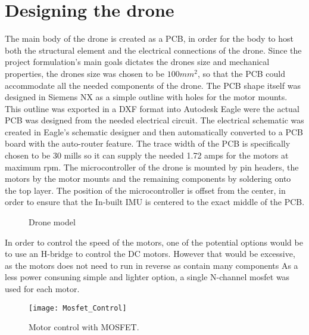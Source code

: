 \documentclass[12pt]{article}
\begin{document}
\section{Designing the drone}

The main body of the drone is created as a PCB, in order for the body to host both the structural element and the electrical connections of the drone. Since the project formulation’s main goals dictates the drones size and mechanical properties, the drones size was chosen to be $100 mm^2$, so that the PCB could accommodate all the needed components of the drone. The PCB shape itself was designed in Siemens NX as a simple outline with holes for the motor mounts. This outline was exported in a DXF format into Autodesk Eagle were the actual PCB was designed from the needed electrical circuit. The electrical schematic was created in Eagle’s schematic designer and then automatically converted to a PCB board with the auto-router feature. The trace width of the PCB is specifically chosen to be 30 mills so it can supply the needed 1.72 amps \cite{PCBTracewidth} for the motors at maximum rpm. The microcontroller of the drone is mounted by pin headers, the motors by the motor mounts and the remaining components by soldering onto the top layer. The position of the microcontroller is offset from the center, in order to ensure that the In-built IMU is centered to the exact middle of the PCB.

\begin{figure}[H]%
    \centering
    \qquad
    \caption{Drone model}%
    \label{fig:example}%
\end{figure}

In order to control the speed of the motors, one of the potential options would be to use an H-bridge to control
the DC motors. However that would be excessive, as the motors does not need to run in reverse as contain many components
As a less power consuning simple and lighter option, a single N-channel mosfet was used for each motor.

\begin{figure}[H]
    \begin{center}
    \texttt{[image: Mosfet\_Control]}
    \end{center}
    \caption{Motor control with MOSFET.}
    \label{fig:Mosfet_Control}
\end{figure}
\end{document}

